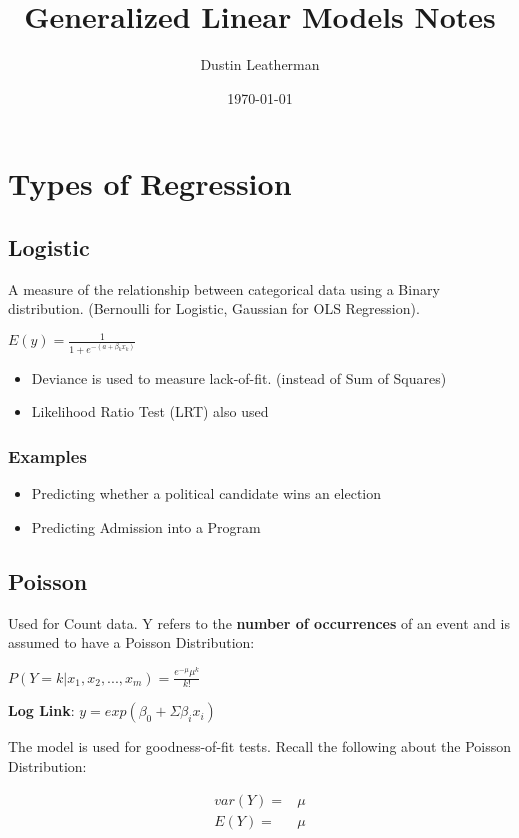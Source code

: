 \documentclass[11pt]{article}
\author{Dustin Leatherman}
\date{\today}
\title{Generalized Linear Models Notes}
\begin{document}
\maketitle
\tableofcontents


\section{Types of Regression}
\label{sec:orga262ebd}
\subsection{Logistic}
\label{sec:org82cf2e7}
A measure of the relationship between categorical data using a Binary
distribution. (Bernoulli for Logistic, Gaussian for OLS Regression).

\(E(y) = \frac{1}{1 + e^{-(a + \beta_k x_k)}}\)

\begin{itemize}
\item Deviance is used to measure lack-of-fit. (instead of Sum of Squares)
\item Likelihood Ratio Test (LRT) also used
\end{itemize}

\subsubsection{Examples}
\label{sec:org2cd6c90}
\begin{itemize}
\item Predicting whether a political candidate wins an election
\item Predicting Admission into a Program
\end{itemize}
\subsection{Poisson}
\label{sec:org0733c8d}
Used for Count data. Y refers to the \textbf{number of occurrences} of an event and is
assumed to have a Poisson Distribution:

\(P(Y = k | x_1, x_2, ..., x_m) = \frac{e^{-\mu} \mu^k}{k!}\)

\textbf{Log Link}: \(y = exp(\beta_0 + \Sigma \beta_i x_i)\)

The model is used for goodness-of-fit tests. Recall the following about the
Poisson Distribution:

\begin{equation}
\begin{split}
var(Y) = & \mu\\
E(Y) = & \mu
\end{split}
\end{equation}
\end{document}
